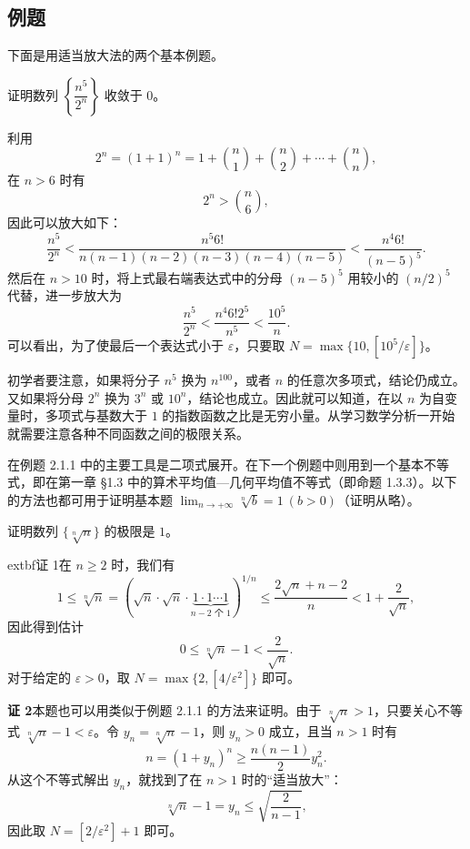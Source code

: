 \subsection{例题}

下面是用适当放大法的两个基本例题。

\begin{xexample}[2.1.1]
证明数列 $\left\{\dfrac{n^5}{2^n}\right\}$ 收敛于 $0$。
\end{xexample}
\begin{xproof}
利用
\[
  2^n=(1+1)^n=1+\binom n1+\binom n2+\cdots+\binom nn,
\]
在 $n>6$ 时有
\[
  2^n>\binom n6,
\]
因此可以放大如下：
\[
  \frac{n^5}{2^n}
  <\frac{n^5 6!}{n(n-1)(n-2)(n-3)(n-4)(n-5)}
  <\frac{n^4 6!}{(n-5)^5}.
\]
然后在 $n>10$ 时，将上式最右端表达式中的分母 $(n-5)^5$ 用较小的 $(n/2)^5$ 代替，进一步放大为
\[
  \frac{n^5}{2^n}<\frac{n^4 6!2^5}{n^5}<\frac{10^5}{n}.
\]
可以看出，为了使最后一个表达式小于 $\varepsilon$，只要取 $N=\max\{10,[10^5/\varepsilon]\}$。
\end{xproof}

\begin{xremark}
初学者要注意，如果将分子 $n^5$ 换为 $n^{100}$，或者 $n$ 的任意次多项式，结论仍成立。又如果将分母 $2^n$ 换为 $3^n$ 或 $10^n$，结论也成立。因此就可以知道，在以 $n$ 为自变量时，多项式与基数大于 $1$ 的指数函数之比是无穷小量。从学习数学分析一开始就需要注意各种不同函数之间的极限关系。
\end{xremark}

在例题 2.1.1 中的主要工具是二项式展开。在下一个例题中则用到一个基本不等式，即在第一章 §1.3 中的算术平均值—几何平均值不等式（即命题 1.3.3）。以下的方法也都可用于证明基本题 $\displaystyle\lim_{n\to+\infty}\sqrt[n]{b}=1\ (b>0)$（证明从略）。

\begin{xexample}[2.1.2]
证明数列 $\{\sqrt[n]{n}\}$ 的极限是 $1$。
\end{xexample}
\begin{xproof}
	extbf{证 1}\quad 在 $n\ge2$ 时，我们有
\[
  1\le\sqrt[n]{n}
  =\left(\sqrt n\cdot\sqrt n\cdot\underbrace{1\cdot1\cdots1}_{n-2\text{ 个 }1}\right)^{1/n}
  \le\frac{2\sqrt n+n-2}{n}
  <1+\frac2{\sqrt n},
\]
因此得到估计
\[
  0\le\sqrt[n]{n}-1<\frac2{\sqrt n}.
\]
对于给定的 $\varepsilon>0$，取 $N=\max\{2,[4/\varepsilon^2]\}$ 即可。

\textbf{证 2}\quad 本题也可以用类似于例题 2.1.1 的方法来证明。由于 $\sqrt[n]{n}>1$，只要关心不等式 $\sqrt[n]{n}-1<\varepsilon$。令 $y_n=\sqrt[n]{n}-1$，则 $y_n>0$ 成立，且当 $n>1$ 时有
\[
  n=(1+y_n)^n\ge\frac{n(n-1)}2y_n^2.
\]
从这个不等式解出 $y_n$，就找到了在 $n>1$ 时的“适当放大”：
\[
  \sqrt[n]{n}-1=y_n\le\sqrt{\frac2{n-1}},
\]
因此取 $N=[2/\varepsilon^2]+1$ 即可。
\end{xproof}

